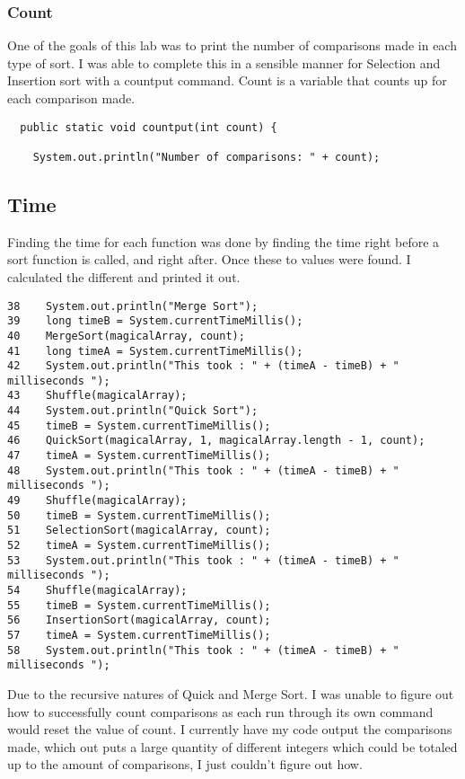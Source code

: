 \documentclass{article}
\begin{document}
\subsubsection{Count}
One of the goals of this lab was to print the number of comparisons made in each type of sort. I was able to complete this in a sensible manner for Selection and Insertion sort with a countput command. Count is a variable that counts up for each comparison made.
\begin{verbatim}
  public static void countput(int count) {

    System.out.println("Number of comparisons: " + count);
\end{verbatim}
\subsection{Time}
Finding the time for each function was done by finding the time right before a sort function is called, and right after. Once these to values were found. I calculated the different and printed it out.
\begin{verbatim}
38    System.out.println("Merge Sort");
39    long timeB = System.currentTimeMillis();
40    MergeSort(magicalArray, count);
41    long timeA = System.currentTimeMillis();
42    System.out.println("This took : " + (timeA - timeB) + " milliseconds ");
43    Shuffle(magicalArray);
44    System.out.println("Quick Sort");
45    timeB = System.currentTimeMillis();
46    QuickSort(magicalArray, 1, magicalArray.length - 1, count);
47    timeA = System.currentTimeMillis();
48    System.out.println("This took : " + (timeA - timeB) + " milliseconds ");
49    Shuffle(magicalArray);
50    timeB = System.currentTimeMillis();
51    SelectionSort(magicalArray, count);
52    timeA = System.currentTimeMillis();
53    System.out.println("This took : " + (timeA - timeB) + " milliseconds ");
54    Shuffle(magicalArray);
55    timeB = System.currentTimeMillis();
56    InsertionSort(magicalArray, count);
57    timeA = System.currentTimeMillis();
58    System.out.println("This took : " + (timeA - timeB) + " milliseconds ");
 \end{verbatim}
Due to the recursive natures of Quick and Merge Sort. I was unable to figure out how to successfully count comparisons as each run through its own command would reset the value of count. I currently have my code output the comparisons made, which out puts a large quantity of different integers which could be totaled up to the amount of comparisons, I just couldn't figure out how. 
\end{document}
